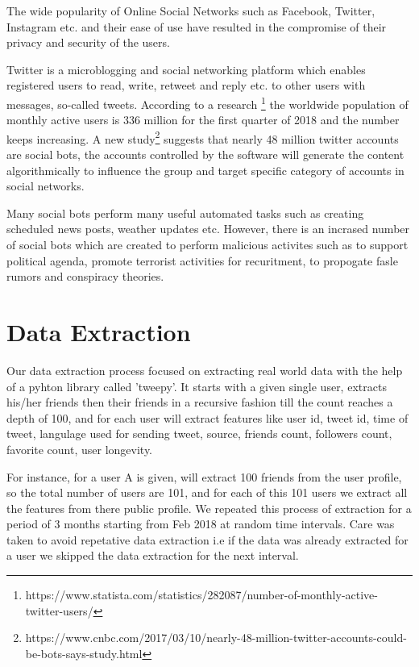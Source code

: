 \documentclass[conference]{IEEEtran}
\begin{document}
The wide popularity of Online Social Networks such as Facebook, Twitter, Instagram etc. and their ease of use have resulted in the compromise of their privacy and security of the users. 

Twitter is a microblogging and social networking  platform which enables registered users to read, write, retweet and reply etc. to other users with messages, so-called tweets.
According to a research \footnote{https://www.statista.com/statistics/282087/number-of-monthly-active-twitter-users/} the worldwide population of monthly active users is 336 million for the first quarter of 2018 and the number keeps increasing. A new study\footnote{https://www.cnbc.com/2017/03/10/nearly-48-million-twitter-accounts-could-be-bots-says-study.html} suggests 
that nearly 48 million twitter accounts are social bots, the accounts controlled by the software will generate the content algorithmically to influence the group and target specific category of accounts in social networks.

Many social bots perform many useful automated tasks such as creating scheduled news posts, weather updates etc. However, there is an incrased number of social bots which are created to perform malicious activites such as to support political agenda, promote terrorist activities for recuritment, to propogate fasle rumors and conspiracy theories. 

\section{Data Extraction}

Our data extraction process focused on extracting real world data with the help of a pyhton library called 'tweepy'. It starts with a given single user, extracts his/her friends then their friends in a recursive fashion till the count reaches a depth of 100, and for each user will extract features like user id, tweet id, time of tweet, langulage used for sending tweet, source, friends count, followers count, favorite count, user longevity.

For instance, for a user A is given, will extract 100 friends from the user profile, so the total number of users are 101, and for each of this 101 users we extract all the features from there public profile. We repeated this process of extraction for a period of 3 months starting from Feb 2018 at random time intervals. Care was taken to avoid repetative data extraction i.e if the data was already extracted for a user we skipped the data extraction for the next interval.
\end{document}
